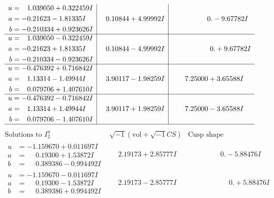 \documentclass[1p]{elsarticle_modified}
\theoremstyle{definition}
\newcommand{\I}{\sqrt{-1}}
\begin{document}
$$\begin{array}{c|c|c}
\begin{aligned}
u &= \phantom{-}1.039050 + 0.322459 I \\
a &= -0.21623 - 1.81335 I \\
b &= -0.210334 + 0.923626 I\end{aligned}
 & \phantom{-}0.10844 + 4.99992 I & \phantom{-0.000000 } 0. - 9.67782 I \\ \hline\begin{aligned}
u &= \phantom{-}1.039050 - 0.322459 I \\
a &= -0.21623 + 1.81335 I \\
b &= -0.210334 - 0.923626 I\end{aligned}
 & \phantom{-}0.10844 - 4.99992 I & \phantom{-0.000000 -}0. + 9.67782 I \\ \hline\begin{aligned}
u &= -0.476392 + 0.716842 I \\
a &= \phantom{-}1.13314 - 1.49944 I \\
b &= \phantom{-}0.079706 + 1.407610 I\end{aligned}
 & \phantom{-}3.90117 - 1.98259 I & \phantom{-}7.25000 + 3.65588 I \\ \hline\begin{aligned}
u &= -0.476392 - 0.716842 I \\
a &= \phantom{-}1.13314 + 1.49944 I \\
b &= \phantom{-}0.079706 - 1.407610 I\end{aligned}
 & \phantom{-}3.90117 + 1.98259 I & \phantom{-}7.25000 - 3.65588 I\\
 \hline 
 \end{array}$$\newpage$$\begin{array}{c|c|c}  
\text{Solutions to }I^u_{2}& \I (\text{vol} + \sqrt{-1}CS) & \text{Cusp shape}\\
 \hline 
\begin{aligned}
u &= -1.159670 + 0.011697 I \\
a &= \phantom{-}0.19300 + 1.53872 I \\
b &= \phantom{-}0.389386 - 0.994492 I\end{aligned}
 & \phantom{-}2.19173 + 2.85777 I & \phantom{-0.000000 } 0. - 5.88476 I \\ \hline\begin{aligned}
u &= -1.159670 - 0.011697 I \\
a &= \phantom{-}0.19300 - 1.53872 I \\
b &= \phantom{-}0.389386 + 0.994492 I\end{aligned}
 & \phantom{-}2.19173 - 2.85777 I & \phantom{-0.000000 -}0. + 5.88476 I \\ \hline\begin{aligned}

\end{aligned}
\end{array}$$
\end{document}
